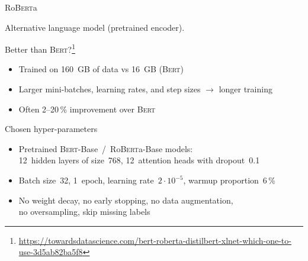 \documentclass[english,handout]{mlutalk}
\newcommand{\Bert}{\textsc{Bert}\xspace}
\newcommand{\BertBase}{\Bert-Base\xspace}
\newcommand{\Roberta}{\mbox{Ro\textsc{Bert}a}\xspace}
\newcommand{\RobertaBase}{\Roberta-Base\xspace}
\begin{document}
\begin{frame}{\Roberta~\cite{LiuOGDJCLLZS2019}}

  Alternative language model (pretrained encoder).

  \begin{block}{Better than \Bert?\footnote{\tiny\smaller\url{https://towardsdatascience.com/bert-roberta-distilbert-xlnet-which-one-to-use-3d5ab82ba5f8}}}
    \begin{itemize}
      \item Trained on 160~GB of data vs 16~GB (\Bert)
      \item Larger mini-batches, learning rates, and step sizes \(\to\) longer training
      \item Often 2--20\,\% improvement over \Bert
    \end{itemize}
  \end{block}

  \begin{block}{Chosen hyper-parameters}
    \begin{itemize}
      \item Pretrained \BertBase~/~\RobertaBase models: \\ 12~hidden layers of size~768, 12~attention heads with dropout~0.1
      \item Batch size~32, 1~epoch, learning rate~\(2 \cdot 10^{-5}\), warmup proportion~6\,\%
      \item No weight decay, no early stopping, no data augmentation, \\ no oversampling, skip missing labels
    \end{itemize}
  \end{block}
\end{frame}
\end{document}
